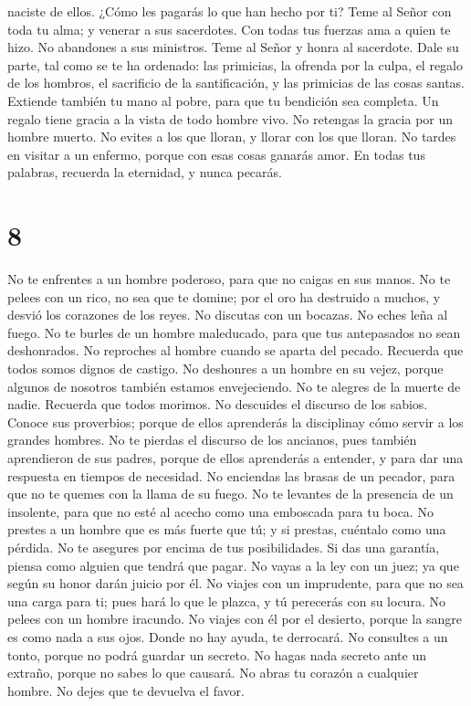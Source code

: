 naciste de ellos. ¿Cómo les pagarás lo que han hecho por ti?
 Teme al Señor con toda tu alma; y venerar a sus
sacerdotes.  Con todas tus fuerzas ama a quien te hizo.
No abandones a sus ministros.  Teme al Señor y honra al
sacerdote. Dale su parte, tal como se te ha ordenado: las primicias, la
ofrenda por la culpa, el regalo de los hombros, el sacrificio de la
santificación, y las primicias de las cosas santas. 
Extiende también tu mano al pobre, para que tu bendición sea completa.
 Un regalo tiene gracia a la vista de todo hombre vivo.
No retengas la gracia por un hombre muerto.  No evites a
los que lloran, y llorar con los que lloran.  No tardes
en visitar a un enfermo, porque con esas cosas ganarás amor.
 En todas tus palabras, recuerda la eternidad, y nunca
pecarás.

\hypertarget{section-7}{%
\section{8}\label{section-7}}

 No te enfrentes a un hombre poderoso, para que no caigas
en sus manos.  No te pelees con un rico, no sea que te
domine; por el oro ha destruido a muchos, y desvió los corazones de los
reyes.  No discutas con un bocazas. No eches leña al
fuego.  No te burles de un hombre maleducado, para que tus
antepasados no sean deshonrados.  No reproches al hombre
cuando se aparta del pecado. Recuerda que todos somos dignos de castigo.
 No deshonres a un hombre en su vejez, porque algunos de
nosotros también estamos envejeciendo.  No te alegres de
la muerte de nadie. Recuerda que todos morimos.  No
descuides el discurso de los sabios. Conoce sus proverbios; porque de
ellos aprenderás la disciplinay cómo servir a los grandes hombres.
 No te pierdas el discurso de los ancianos, pues también
aprendieron de sus padres, porque de ellos aprenderás a entender, y para
dar una respuesta en tiempos de necesidad.  No enciendas
las brasas de un pecador, para que no te quemes con la llama de su
fuego.  No te levantes de la presencia de un insolente,
para que no esté al acecho como una emboscada para tu boca.
 No prestes a un hombre que es más fuerte que tú; y si
prestas, cuéntalo como una pérdida.  No te asegures por
encima de tus posibilidades. Si das una garantía, piensa como alguien
que tendrá que pagar.  No vayas a la ley con un juez; ya
que según su honor darán juicio por él.  No viajes con un
imprudente, para que no sea una carga para ti; pues hará lo que le
plazca, y tú perecerás con su locura.  No pelees con un
hombre iracundo. No viajes con él por el desierto, porque la sangre es
como nada a sus ojos. Donde no hay ayuda, te derrocará. 
No consultes a un tonto, porque no podrá guardar un secreto.
 No hagas nada secreto ante un extraño, porque no sabes
lo que causará.  No abras tu corazón a cualquier hombre.
No dejes que te devuelva el favor.

